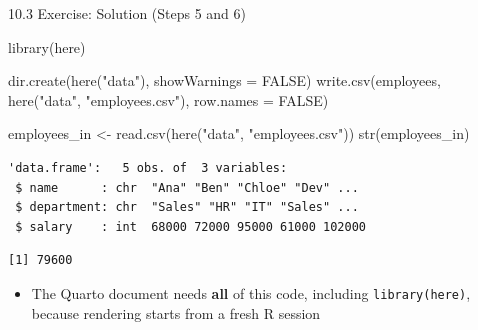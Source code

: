 \documentclass[
  ignorenonframetext,
  aspectratio=169,
]{beamer}
\newenvironment{Shaded}{\begin{snugshade}}{\end{snugshade}}
\newcommand{\AttributeTok}[1]{\textcolor[rgb]{0.40,0.45,0.13}{#1}}
\newcommand{\ConstantTok}[1]{\textcolor[rgb]{0.56,0.35,0.01}{#1}}
\newcommand{\FunctionTok}[1]{\textcolor[rgb]{0.28,0.35,0.67}{#1}}
\newcommand{\NormalTok}[1]{\textcolor[rgb]{0.00,0.23,0.31}{#1}}
\newcommand{\OtherTok}[1]{\textcolor[rgb]{0.00,0.23,0.31}{#1}}
\newcommand{\SpecialCharTok}[1]{\textcolor[rgb]{0.37,0.37,0.37}{#1}}
\newcommand{\StringTok}[1]{\textcolor[rgb]{0.13,0.47,0.30}{#1}}
\providecommand{\tightlist}{%
  \setlength{\itemsep}{0pt}\setlength{\parskip}{0pt}}
\begin{document}
\begin{frame}[fragile]{10.3 Exercise: Solution (Steps 5 and 6)}
\protect{}\label{exercise-solution-steps-5-and-6}
\begin{Shaded}
\begin{Highlighting}[]
\FunctionTok{library}\NormalTok{(here)}

\FunctionTok{dir.create}\NormalTok{(}\FunctionTok{here}\NormalTok{(}\StringTok{"data"}\NormalTok{), }\AttributeTok{showWarnings =} \ConstantTok{FALSE}\NormalTok{)}
\FunctionTok{write.csv}\NormalTok{(employees, }\FunctionTok{here}\NormalTok{(}\StringTok{"data"}\NormalTok{, }\StringTok{"employees.csv"}\NormalTok{), }\AttributeTok{row.names =} \ConstantTok{FALSE}\NormalTok{)}

\NormalTok{employees\_in }\OtherTok{\textless{}{-}} \FunctionTok{read.csv}\NormalTok{(}\FunctionTok{here}\NormalTok{(}\StringTok{"data"}\NormalTok{, }\StringTok{"employees.csv"}\NormalTok{))}
\FunctionTok{str}\NormalTok{(employees\_in)}
\end{Highlighting}
\end{Shaded}

\begingroup\tiny\color{darkgray}

\begin{verbatim}
'data.frame':   5 obs. of  3 variables:
 $ name      : chr  "Ana" "Ben" "Chloe" "Dev" ...
 $ department: chr  "Sales" "HR" "IT" "Sales" ...
 $ salary    : int  68000 72000 95000 61000 102000
\end{verbatim}

\endgroup

\begin{Shaded}
\end{Shaded}

\begingroup\tiny\color{darkgray}

\begin{verbatim}
[1] 79600
\end{verbatim}

\endgroup

\begin{itemize}
\tightlist
\item
  The Quarto document needs \textbf{all} of this code, including
  \texttt{library(here)}, because rendering starts from a fresh R
  session
\end{itemize}
\end{frame}
\end{document}
